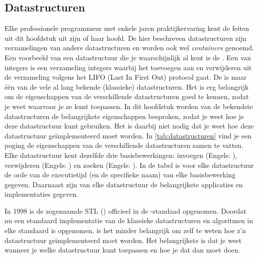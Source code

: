 \begin{cpplstShortInline}
\section{Datastructuren}
\label{sec:Datastructuren}
Elke professionele programmeur met enkele jaren praktijkervaring kent de feiten uit dit hoofdstuk uit zijn of haar hoofd.
De hier beschreven datastructuren zijn verzamelingen van andere datastructuren en worden ook wel \emph{containers} genoemd.
Een voorbeeld van een datastructuur die je waarschijnlijk al kent is de .
Een  van integers is een verzameling integers waarbij het toevoegen aan en verwijderen uit de verzameling volgens het LIFO (Last In First Out) protocol gaat.
De  is maar één van de vele al lang bekende (klassieke) datastructuren.
Het is erg belangrijk om de eigenschappen van de verschillende datastructuren goed te kennen, zodat je weet waarvoor je ze kunt toepassen.
In dit hoofdstuk worden van de bekendste datastructuren de belangrijkste eigenschappen besproken, zodat je weet hoe je deze datastructuur kunt gebruiken.
Het is daarbij niet nodig dat je weet hoe deze datastructuur geïmplementeerd moet worden.
In 
\cref{tab:datastructuren}
vind je een poging de eigenschappen van de verschillende datastructuren samen te vatten.
Elke  datastructuur kent dezelfde drie basisbewerkingen: invoegen (Engels: ), verwijderen (Engels: ) en zoeken (Engels: ).
In de tabel is voor elke datastructuur de orde van de executietijd (en de specifieke naam) van elke basisbewerking gegeven.
Daarnaast zijn van elke datastructuur de belangrijkste applicaties en implementaties gegeven.

In 1998 is de zogenaamde STL () officieel in de \Cpp{}\hyp{}standaad opgenomen.
Doordat nu een standaard implementatie van de klassieke datastructuren en algoritmen in elke standaard \Cpp{}  is opgenomen, is het minder belangrijk om zelf te weten hoe z'n datastructuur geïmplementeerd moet worden.
Het belangrijkste is dat je weet wanneer je welke datastructuur kunt toepassen en hoe je dat dan moet doen.


\end{cpplstShortInline}
